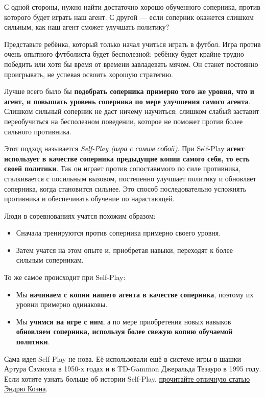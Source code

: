 \documentclass[11pt,a4paper]{article}
\begin{document}
С одной стороны, нужно найти достаточно хорошо обученного соперника, против которого будет играть наш агент. С другой --- если соперник окажется слишком сильным, как наш агент сможет улучшать политику?

Представьте ребёнка, который только начал учиться играть в футбол. Игра против очень опытного футболиста будет бесполезной: ребёнку будет крайне трудно победить или хотя бы время от времени завладевать мячом. Он станет постоянно проигрывать, не успевая освоить хорошую стратегию.

Лучше всего было бы \textbf{подобрать соперника примерно того же уровня, что и агент, и повышать уровень соперника по мере улучшения самого агента}. Слишком сильный соперник не даст ничему научиться; слишком слабый заставит переобучиться на бесполезном поведении, которое не поможет против более сильного противника.

Этот подход называется \emph{Self-Play (игра с самим собой)}. При Self-Play \textbf{агент использует в качестве соперника предыдущие копии самого себя, то есть своей политики}. Так он играет против сопоставимого по силе противника, сталкивается с посильным вызовом, постепенно улучшает политику и обновляет соперника, когда становится сильнее. Это способ последовательно усложнять противника и обеспечивать обучение по нарастающей.

Люди в соревнованиях учатся похожим образом:

\begin{itemize}
\tightlist
\item
  Сначала тренируются против соперника примерно своего уровня.
\item
  Затем учатся на этом опыте и, приобретая навыки, переходят к более сильным соперникам.
\end{itemize}

То же самое происходит при Self-Play:

\begin{itemize}
\tightlist
\item
  Мы \textbf{начинаем с копии нашего агента в качестве соперника}, поэтому их уровни примерно одинаковы.
\item
  Мы \textbf{учимся на игре с ним}, а по мере приобретения новых навыков \textbf{обновляем соперника, используя более свежую копию обучаемой политики}.
\end{itemize}

Сама идея Self-Play не нова. Её использовали ещё в системе игры в шашки Артура Сэмюэла в 1950-х годах и в TD-Gammon Джеральда Тезауро в 1995 году. Если хотите узнать больше об истории Self-Play, \href{https://blog.unity.com/technology/training-intelligent-adversaries-using-self-play-with-ml-agents}{прочитайте отличную статью Эндрю Коэна}.
\end{document}
